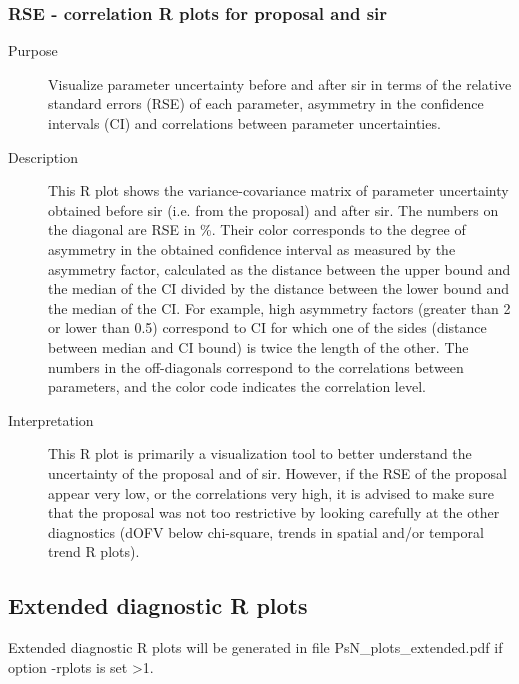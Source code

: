 \subsubsection{RSE - correlation R plots for proposal and sir}
\begin{description}
\item[Purpose] Visualize parameter uncertainty before and after sir in terms of the relative standard errors (RSE) of each parameter, asymmetry in the confidence intervals (CI) and correlations between parameter uncertainties.
\item[Description] This R plot shows the variance-covariance matrix of parameter uncertainty obtained before sir (i.e. from the proposal) and after sir. The numbers on the diagonal are RSE in \%. Their color corresponds to the degree of asymmetry in the obtained confidence interval as measured by the asymmetry factor, calculated as the distance between the upper bound and the  median of the CI divided by the distance between the lower bound and the median of the CI. For example, high asymmetry factors (greater than 2 or lower than 0.5) correspond to CI for which one of the sides (distance between median and CI bound) is twice the length of the other. The numbers in the off-diagonals correspond to the correlations between parameters, and the color code indicates the correlation level.
\item[Interpretation] This R plot is primarily a visualization tool to better understand the uncertainty of the proposal and of sir. However, if the RSE of the proposal appear very low, or the correlations very high, it is advised to make sure that the proposal was not too restrictive by looking carefully at the other diagnostics (dOFV below chi-square, trends in spatial and/or temporal trend R plots).
\end{description}


\subsection{Extended diagnostic R plots}
Extended diagnostic R plots will be generated in file PsN\_plots\_extended.pdf if option -rplots is set >1.

